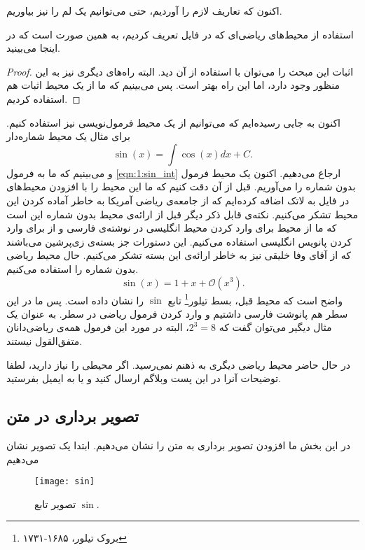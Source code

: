 اکنون که تعاریف لازم را آوردیم، حتی می‌توانیم یک لم را نیز بیاوریم.
\begin{lem}
استفاده از محیط‌های ریاضی‌ای که در فایل  تعریف کردیم، به همین صورت است که در اینجا می‌بینید.
\end{lem}
\begin{proof}
اثبات این مبحث را می‌توان با استفاده از آن دید. البته راه‌های دیگری نیز به این منظور وجود دارد، اما این راه بهتر است. پس می‌بینیم که ما از یک محیط اثبات هم استفاده کردیم.
\end{proof}

اکنون به جایی رسیده‌ایم که می‌توانیم از یک محیط فرمول‌نویسی نیز استفاده کنیم. برای مثال یک محیط شماره‌دار
\begin{equation}
\label{eqn:1:sin_int}
\sin(x) = \int\cos(x)dx + C.
\end{equation}
و می‌بینیم که ما به فرمول \eqref{eqn:1:sin_int} ارجاع می‌دهیم. اکنون یک محیط فرمول بدون شماره را می‌آوریم. قبل از آن دقت کنیم که ما این محیط را با افزودن محیط‌های  در فایل  به لاتک اضافه کرده‌ایم که از جامعه‌ی ریاضی آمریکا به خاطر آماده کردن این محیط تشکر می‌کنیم. نکته‌ی قابل ذکر دیگر قبل از ارائه‌ی محیط بدون شماره این است که ما از محیط  برای وارد کردن محیط انگلیسی در نوشته‌ی فارسی و از  برای وارد کردن پانویس انگلیسی استفاده می‌کنیم. این دستورات جز بسته‌ی زی‌پرشین می‌باشند که از آقای وفا خلیقی نیز به خاطر ارائه‌ی این بسته تشکر می‌کنیم. حال محیط ریاضی بدون شماره را استفاده می‌کنیم.
\begin{equation*}
\sin(x) = 1 + x + \mathcal{O}(x^3).
\end{equation*}
واضح است که محیط قبل، بسط تیلور\footnote{بروک تیلور، ۱۶۸۵-۱۷۳۱} تابع $\sin$ را نشان داده است. پس ما در این سطر هم پانوشت فارسی داشتیم و وارد کردن فرمول ریاضی در سطر. به عنوان یک مثال دیگیر می‌توان گفت که $2^3 = 8$، البته در مورد این فرمول همه‌ی ریاضی‌دانان متفق‌القول نیستند.

در حال حاضر محیط ریاضی دیگری به ذهنم نمی‌رسید. اگر محیطی را نیاز دارید، لطفا توضیحات آنرا در این پست وبلاگم  ارسال کنید و یا به  ایمیل بفرستید.

\subsection{تصویر برداری در متن}
\label{ssec:usegraphics}
در این بخش ما افزودن تصویر برداری به متن را نشان می‌دهیم. ابتدا یک تصویر نشان می‌دهیم
\begin{figure}[!h]
\centerline{\texttt{[image: sin]}}
\caption{تصویر تابع $\sin$.}
\label{fig:1:sin}
\end{figure}

